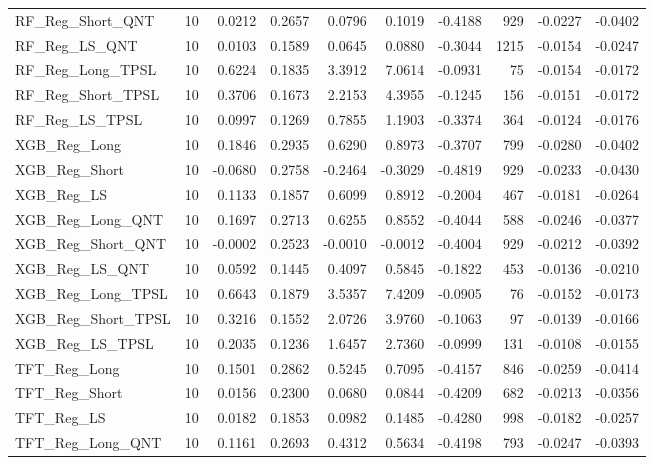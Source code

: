 \begin{tabular}{llrrrrrrrr}
\cline{1-10}
RF\_Reg\_Short\_QNT & 10 & 0.0212 & 0.2657 & 0.0796 & 0.1019 & -0.4188 & 929 & -0.0227 & -0.0402 \\
\cline{1-10}
RF\_Reg\_LS\_QNT & 10 & 0.0103 & 0.1589 & 0.0645 & 0.0880 & -0.3044 & 1215 & -0.0154 & -0.0247 \\
\cline{1-10}
RF\_Reg\_Long\_TPSL & 10 & 0.6224 & 0.1835 & 3.3912 & 7.0614 & -0.0931 & 75 & -0.0154 & -0.0172 \\
\cline{1-10}
RF\_Reg\_Short\_TPSL & 10 & 0.3706 & 0.1673 & 2.2153 & 4.3955 & -0.1245 & 156 & -0.0151 & -0.0172 \\
\cline{1-10}
RF\_Reg\_LS\_TPSL & 10 & 0.0997 & 0.1269 & 0.7855 & 1.1903 & -0.3374 & 364 & -0.0124 & -0.0176 \\
\cline{1-10}
XGB\_Reg\_Long & 10 & 0.1846 & 0.2935 & 0.6290 & 0.8973 & -0.3707 & 799 & -0.0280 & -0.0402 \\
\cline{1-10}
XGB\_Reg\_Short & 10 & -0.0680 & 0.2758 & -0.2464 & -0.3029 & -0.4819 & 929 & -0.0233 & -0.0430 \\
\cline{1-10}
XGB\_Reg\_LS & 10 & 0.1133 & 0.1857 & 0.6099 & 0.8912 & -0.2004 & 467 & -0.0181 & -0.0264 \\
\cline{1-10}
XGB\_Reg\_Long\_QNT & 10 & 0.1697 & 0.2713 & 0.6255 & 0.8552 & -0.4044 & 588 & -0.0246 & -0.0377 \\
\cline{1-10}
XGB\_Reg\_Short\_QNT & 10 & -0.0002 & 0.2523 & -0.0010 & -0.0012 & -0.4004 & 929 & -0.0212 & -0.0392 \\
\cline{1-10}
XGB\_Reg\_LS\_QNT & 10 & 0.0592 & 0.1445 & 0.4097 & 0.5845 & -0.1822 & 453 & -0.0136 & -0.0210 \\
\cline{1-10}
XGB\_Reg\_Long\_TPSL & 10 & 0.6643 & 0.1879 & 3.5357 & 7.4209 & -0.0905 & 76 & -0.0152 & -0.0173 \\
\cline{1-10}
XGB\_Reg\_Short\_TPSL & 10 & 0.3216 & 0.1552 & 2.0726 & 3.9760 & -0.1063 & 97 & -0.0139 & -0.0166 \\
\cline{1-10}
XGB\_Reg\_LS\_TPSL & 10 & 0.2035 & 0.1236 & 1.6457 & 2.7360 & -0.0999 & 131 & -0.0108 & -0.0155 \\
\cline{1-10}
TFT\_Reg\_Long & 10 & 0.1501 & 0.2862 & 0.5245 & 0.7095 & -0.4157 & 846 & -0.0259 & -0.0414 \\
\cline{1-10}
TFT\_Reg\_Short & 10 & 0.0156 & 0.2300 & 0.0680 & 0.0844 & -0.4209 & 682 & -0.0213 & -0.0356 \\
\cline{1-10}
TFT\_Reg\_LS & 10 & 0.0182 & 0.1853 & 0.0982 & 0.1485 & -0.4280 & 998 & -0.0182 & -0.0257 \\
\cline{1-10}
TFT\_Reg\_Long\_QNT & 10 & 0.1161 & 0.2693 & 0.4312 & 0.5634 & -0.4198 & 793 & -0.0247 & -0.0393 \\

\end{tabular}
